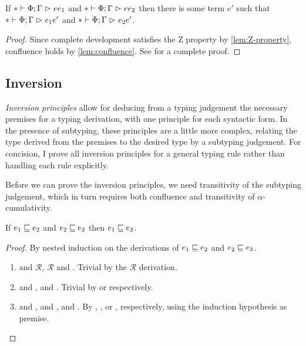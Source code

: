 \begin{theorem}[Confluence] \label{thm:confluence}
If $* \mathrel{\vdash} \Phi; \Gamma \mathrel{\rhd}_{} e{e_1}$ and $* \mathrel{\vdash} \Phi; \Gamma \mathrel{\rhd}_{} e{e_2}$
then there is some term $e'$ such that
$* \mathrel{\vdash} \Phi; \Gamma \mathrel{\rhd}_{} e_1{e'}$ and $* \mathrel{\vdash} \Phi; \Gamma \mathrel{\rhd}_{} e_2{e'}$.
\end{theorem}

\begin{proof}
Since complete development satisfies the Z property by \cref{lem:Z-property},
confluence holds by \cref{lem:confluence}.
See \citet[Theorem 3.10]{confluence} for a complete proof.
\end{proof}

\subsection{Inversion}

\emph{Inversion principles}
allow for deducing from a typing judgement the necessary premises for a typing derivation,
with one principle for each syntactic form.
In the presence of subtyping, these principles are a little more complex,
relating the type derived from the premises to the desired type by a subtyping judgement.
For concision, I prove all inversion principles for a general typing rule
rather than handling each rule explicitly.

Before we can prove the inversion principles,
we need transitivity of the subtyping judgement,
which in turn requires both confluence and transitivity of $\alpha$-cumulativity.

\begin{lemma} \label{lem:transitivity-acum}
If $e_1 \mathrel{\sqsubseteq} e_2$ and $e_2 \mathrel{\sqsubseteq} e_3$ then $e_1 \mathrel{\sqsubseteq} e_3$.
\end{lemma}

\begin{proof}
By nested induction on the derivations of $e_1 \mathrel{\sqsubseteq} e_2$ and $e_2 \mathrel{\sqsubseteq} e_3$.
\begin{enumerate}[noitemsep, label=\textbf{Cases}, leftmargin=*, labelindent=\parindent]
  \item {} and $\mathcal{R}$, $\mathcal{R}$ and .
    Trivial by the $\mathcal{R}$ derivation.
  \item {} and ,  and .
    Trivial by  or  respectively.
  \item {} and ,  and ,  and .
    By , , or , respectively,
    using the induction hypothesis as premise. \qedhere
\end{enumerate}
\end{proof}

